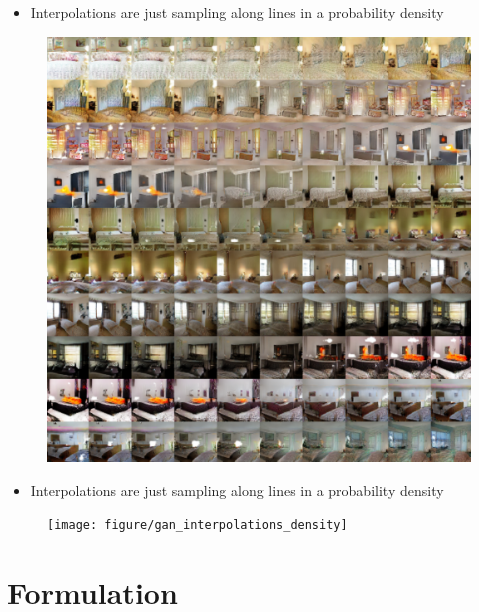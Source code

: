 \documentclass[10pt,mathserif]{beamer}
\begin{document}
\begin{frame}
\begin{itemize}
\item Interpolations are just sampling along lines in a probability density
\end{itemize}
\begin{figure}[ht]
  \centering
  \includegraphics[width=0.7\paperwidth]{figure/gans_interpolations}
  \caption{\label{fig:gan_interpolations} }
\end{figure}
\end{frame}

\begin{frame}
\begin{itemize}
  \item Interpolations are just sampling along lines in a probability density
\end{itemize}
\begin{figure}[ht]
  \centering
  \texttt{[image: figure/gan\_interpolations\_density]}
  \caption{\label{fig:gan_interpolations_density} }
\end{figure}
\end{frame}

\section{Formulation}
\end{document}
